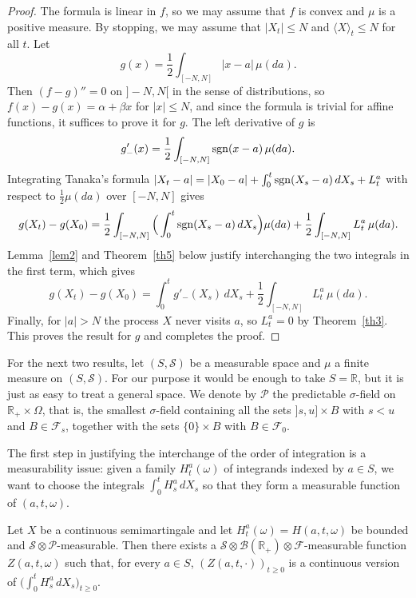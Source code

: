 \begin{proof}
	The formula is linear in $f$, so we may assume that $f$ is convex and
	$\mu$ is a positive measure. By stopping, we may assume that
	$|X_t| \leqslant N$ and $\langle X\rangle _t \leqslant N$ for all $t$.
	Let
	\[
		g(x)=\frac{1}{2}\int_{[-N,N]} |x-a|\,\mu(da) .
	\]
	Then $(f-g)''=0$ on $]-N,N[$ in the sense of distributions, so
	$f(x)-g(x)=\alpha+\beta x$ for $|x|\leqslant N$, and since the formula is
	trivial for affine functions, it suffices to prove it for $g$. The left
	derivative of $g$ is
	\[
		g'_-(x)=\frac{1}{2}\int_{[-N,N]} \operatorname{sgn}(x-a)\,\mu(da) .
	\]
	Integrating Tanaka's formula
	$|X_t - a| =|X_0 - a| + \int_0^t \operatorname{sgn}( X_s - a)\,dX_s + L_t^a$
	with respect to $\frac{1}{2}\mu(da)$ over $[-N,N]$ gives
	\[
		g(X_t)-g(X_0)= \frac{1}{2} \int_{[-N,N]} \Big(\int_0^t \operatorname{sgn}( X_s - a)\,dX_s\Big)\mu(da)
		+ \frac{1}{2} \int_{[-N,N]} L_t^a\, \mu(da) .
	\]
	Lemma~\ref{lem2} and Theorem~\ref{th5} below justify interchanging the
	two integrals in the first term, which gives
	\[
		g(X_t)-g(X_0)= \int_0^t g'_-(X_s)\,dX_s + \frac{1}{2} \int_{[-N,N]} L_t^a\,\mu(da) .
	\]
	Finally, for $|a| > N$ the process $X$ never visits $a$, so $L_t^a=0$ by
	Theorem~\ref{th3}. This proves the result for $g$ and completes the proof.
\end{proof}

For the next two results, let $(S,\mathcal{S})$ be a measurable space and
$\mu$ a finite measure on $(S,\mathcal{S})$. For our purpose it would be enough
to take $S=\mathbb{R}$, but it is just as easy to treat a general space. We
denote by $\mathcal{P}$ the predictable $\sigma$-field on
$\mathbb{R}_+\times\Omega$, that is, the smallest $\sigma$-field containing
all the sets $]s,u]\times B$ with $s<u$ and $B\in \mathcal{F}_s$, together
with the sets $\{0\}\times B$ with $B \in\mathcal{F}_0$.

The first step in justifying the interchange of the order of integration is a
measurability issue: given a family $H_t^a(\omega)$ of integrands indexed by
$a \in S$, we want to choose the integrals $\int_0^t H_s^a\,dX_s$ so that they
form a measurable function of $(a,t,\omega)$.

\begin{lemma}\label{lem2}
	Let $X$ be a continuous semimartingale and let
	$H_t^a(\omega)=H(a,t,\omega)$ be bounded and
	$\mathcal{S} \otimes \mathcal{P}$-measurable. Then there exists a
	$\mathcal{S} \otimes \mathcal{B}(\mathbb{R}_+)\otimes\mathcal{F}$-measurable
	function $Z(a,t,\omega)$ such that, for every $a\in S$,
	$(Z(a,t,\cdot))_{t\geqslant 0}$ is a continuous version of
	$\big(\int_0^t H_s^a\,dX_s\big)_{t\geqslant 0}$.
\end{lemma}

